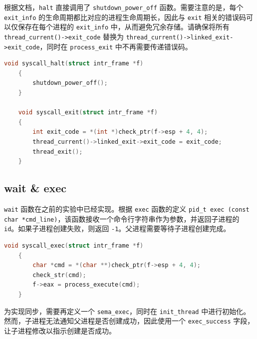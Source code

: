 \documentclass{article}
\begin{document}
根据文档，\texttt{halt} 直接调用了 \texttt{shutdown\_power\_off} 函数。需要注意的是，每个 \texttt{exit\_info} 的生命周期都比对应的进程生命周期长，因此与 \texttt{exit} 相关的错误码可以仅保存在每个进程的 \texttt{exit\_info} 中，从而避免冗余存储。请确保将所有 \texttt{thread\_current()->exit\_code} 替换为 \texttt{thread\_current()->linked\_exit->exit\_code}，同时在 \texttt{process\_exit} 中不再需要传递错误码。

\begin{lstlisting}[language=C]
	void syscall_halt(struct intr_frame *f)
	{
		shutdown_power_off();
	}
	
	void syscall_exit(struct intr_frame *f)
	{
		int exit_code = *(int *)check_ptr(f->esp + 4, 4);
		thread_current()->linked_exit->exit_code = exit_code;
		thread_exit();
	}
\end{lstlisting}

\subsection{wait \& exec}

\texttt{wait} 函数在之前的实验中已经实现。根据 \texttt{exec} 函数的定义 \texttt{pid\_t exec (const char *cmd\_line)}，该函数接收一个命令行字符串作为参数，并返回子进程的 \texttt{id}。如果子进程创建失败，则返回 \texttt{-1}。父进程需要等待子进程创建完成。

\begin{lstlisting}[language=C]
	void syscall_exec(struct intr_frame *f)
	{
		char *cmd = *(char **)check_ptr(f->esp + 4, 4);
		check_str(cmd);
		f->eax = process_execute(cmd);
	}
\end{lstlisting}

为实现同步，需要再定义一个 \texttt{sema\_exec}，同时在 \texttt{init\_thread} 中进行初始化。然而，子进程无法通知父进程是否创建成功，因此使用一个 \texttt{exec\_success} 字段，让子进程修改以指示创建是否成功。
\end{document}

